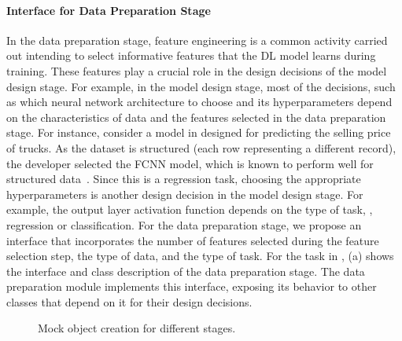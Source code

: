 \paragraph{Interface for Data Preparation Stage}
In the data preparation stage, feature engineering is a common activity carried out intending to select informative features that the DL model learns during training.
These features play a crucial role in the design decisions of the model design stage.
For example, in the model design stage, most of the decisions, such as which neural network architecture to choose and its hyperparameters depend on the characteristics of data and the features selected in the data preparation stage. 
For instance, consider a model in  designed for predicting the selling price of trucks.
As the dataset is structured (each row representing a different record), 
the developer selected the FCNN model, which is known to perform well for structured data~\cite{borisov2022deep}.
Since this is a regression task, choosing the appropriate hyperparameters is another design decision in the model design stage.
For example, the output layer activation function depends on the type of task, \ie, regression or classification.
For the data preparation stage, we propose an interface that incorporates the number of features selected during the feature selection step, the type of data, and the type of task.
For the task in , (a) shows the interface and class description of the data preparation stage. 
The data preparation module implements this interface, exposing its behavior to other classes that depend on it for their design decisions.

\begin{figure*}[t!]
    \centering
    \qquad
    \caption{Mock object creation for different stages.}%
    \label{fig:MockCreation}
\vspace{-0.5cm}
\end{figure*}


